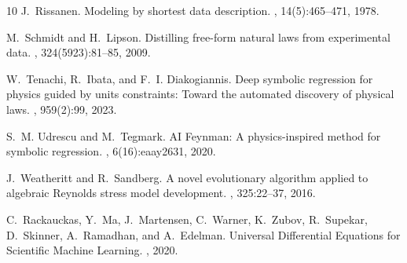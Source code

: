 \documentclass{article}
\begin{document}
\begin{thebibliography}{10}
J.~Rissanen.
\newblock Modeling by shortest data description.
, 14(5):465--471, 1978.

M.~Schmidt and H.~Lipson.
\newblock Distilling free-form natural laws from experimental data.
, 324(5923):81--85, 2009.

W.~Tenachi, R.~Ibata, and F.~I. Diakogiannis.
\newblock Deep symbolic regression for physics guided by units constraints: Toward the automated discovery of physical laws.
, 959(2):99, 2023.

S.~M. Udrescu and M.~Tegmark.
\newblock AI Feynman: A physics-inspired method for symbolic regression.
, 6(16):eaay2631, 2020.

J.~Weatheritt and R.~Sandberg.
\newblock A novel evolutionary algorithm applied to algebraic Reynolds stress model development.
, 325:22--37, 2016.

C.~Rackauckas, Y.~Ma, J.~Martensen, C.~Warner, K.~Zubov, R.~Supekar, D.~Skinner, A.~Ramadhan, and A.~Edelman.
\newblock Universal Differential Equations for Scientific Machine Learning.
, 2020.

\end{thebibliography}
\end{document}
